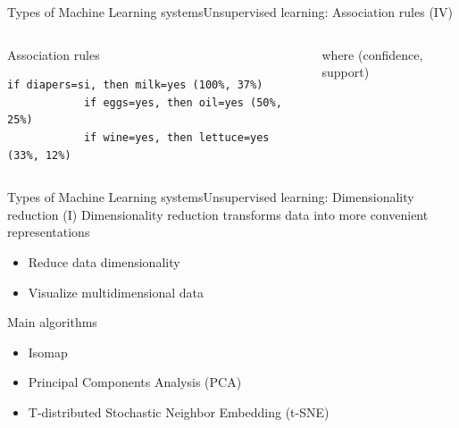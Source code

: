 \documentclass[10pt,compress]{beamer} %
\begin{document}
\begin{frame}[fragile]{Types of Machine Learning systems}{Unsupervised learning: Association rules (IV)}
    \begin{columns}
	   		\begin{exampleblock}{Association rules}
	   		\begin{lstlisting}[firstnumber=1, xleftmargin=10pt] 
			if diapers=si, then milk=yes (100%, 37%)
			if eggs=yes, then oil=yes (50%, 25%)
			if wine=yes, then lettuce=yes (33%, 12%)
	   		\end{lstlisting}
	   		\end{exampleblock}

			where (confidence, support)
	\end{columns}
\end{frame}

\begin{frame}{Types of Machine Learning systems}{Unsupervised learning: Dimensionality reduction (I)}
	Dimensionality reduction transforms data into more convenient representations
	\begin{itemize}
		\item Reduce data dimensionality
		\item Visualize multidimensional data
	\end{itemize}

	Main algorithms
	\begin{itemize}
		\item Isomap
		\item Principal Components Analysis (PCA)
		\item T-distributed Stochastic Neighbor Embedding (t-SNE)
	\end{itemize}
\end{frame}
\end{document}
